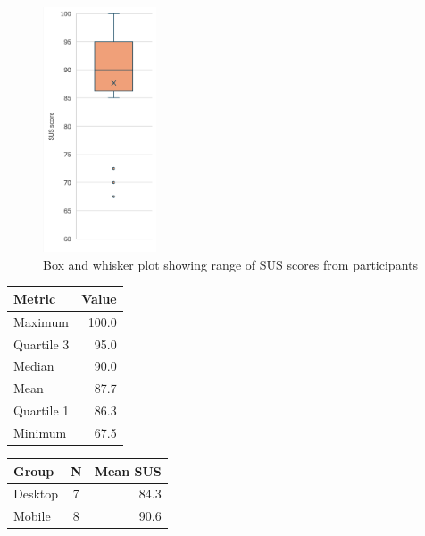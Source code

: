 \begin{figure}[H]
    \centering
    \includegraphics[width=0.3\textwidth]{contents/part-4/fig4/box-whisker.png}
    \caption{Box and whisker plot showing range of SUS scores from participants}
    \label{fig:box-whisker}
\end{figure}

\begin{table}[H]
  \centering
  \small
  \begin{minipage}[t]{0.48\textwidth}
    \centering
    \begin{tabular}{l r}
      \hline
      Metric & Value \\
      \hline
      Maximum     & 100.0 \\
      Quartile 3  & 95.0 \\
      Median      & 90.0 \\
      Mean        & 87.7 \\
      Quartile 1  & 86.3 \\
      Minimum     & 67.5 \\
      \hline
    \end{tabular}
    \label{tab:sus-metrics}
  \end{minipage}\hfill
  \begin{minipage}[t]{0.48\textwidth}
    \centering
    \begin{tabular}{l c r}
      \hline
      Group & N & Mean SUS \\
      \hline
      Desktop & 7 & 84.3 \\
      Mobile  & 8 & 90.6 \\
      \hline
    \end{tabular}
    \label{tab:sus-by-device}
  \end{minipage}
\end{table} 

